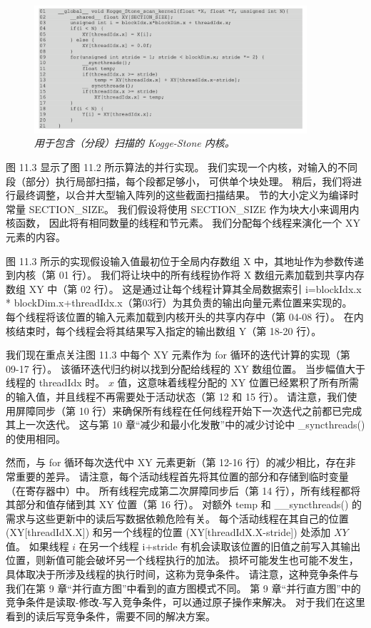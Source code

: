 \begin{figure}[H]
	\centering
	\includegraphics[width=0.9\textwidth]{figs/F11.3.png}
	\caption{\textit{用于包含（分段）扫描的 Kogge-Stone 内核。}}
\end{figure}

图 11.3 显示了图 11.2 所示算法的并行实现。 我们实现一个内核，对输入的不同段（部分）执行局部扫描，每个段都足够小，
可供单个块处理。 稍后，我们将进行最终调整，以合并大型输入阵列的这些截面扫描结果。 
节的大小定义为编译时常量 SECTION\_SIZE。 我们假设将使用 SECTION\_SIZE 作为块大小来调用内核函数，
因此将有相同数量的线程和节元素。 我们分配每个线程来演化一个 $\mathrm{XY}$ 元素的内容。

图 11.3 所示的实现假设输入值最初位于全局内存数组 $\mathrm{X}$ 中，其地址作为参数传递到内核（第 01 行）。 
我们将让块中的所有线程协作将 $\mathrm{X}$ 数组元素加载到共享内存数组 XY 中（第 02 行）。 
这是通过让每个线程计算其全局数据索引 i=blockIdx.x * blockDim.x+threadIdx.x（第03行）为其负责的输出向量元素位置来实现的。 
每个线程将该位置的输入元素加载到内核开头的共享内存中（第 04-08 行）。
在内核结束时，每个线程会将其结果写入指定的输出数组 Y（第 18-20 行）。

我们现在重点关注图 11.3 中每个 $\mathrm{XY}$ 元素作为 for 循环的迭代计算的实现（第 09-17 行）。 
该循环迭代归约树以找到分配给线程的 $\mathrm{XY}$ 数组位置。 当步幅值大于线程的 threadIdx 时。 
$x$ 值，这意味着线程分配的 XY 位置已经累积了所有所需的输入值，并且线程不再需要处于活动状态（第 12 和 15 行）。 
请注意，我们使用屏障同步（第 10 行）来确保所有线程在任何线程开始下一次迭代之前都已完成其上一次迭代。 
这与第 10 章“减少和最小化发散”中的减少讨论中 \_syncthreads() 的使用相同。

然而，与 for 循环每次迭代中 XY 元素更新（第 12-16 行）的减少相比，存在非常重要的差异。 
请注意，每个活动线程首先将其位置的部分和存储到临时变量（在寄存器中）中。 
所有线程完成第二次屏障同步后（第 14 行），所有线程都将其部分和值存储到其 $\mathrm{XY}$ 位置（第 16 行）。 
对额外 temp 和 \_\_syncthreads() 的需求与这些更新中的读后写数据依赖危险有关。 
每个活动线程在其自己的位置 (XY[threadIdX.X]) 和另一个线程的位置 (XY[threadIdX.X-stride]) 处添加 $X Y$ 值。 
如果线程 $i$ 在另一个线程 i+stride 有机会读取该位置的旧值之前写入其输出位置，则新值可能会破坏另一个线程执行的加法。 
损坏可能发生也可能不发生，具体取决于所涉及线程的执行时间，这称为竞争条件。 
请注意，这种竞争条件与我们在第 9 章“并行直方图”中看到的直方图模式不同。 
第 9 章“并行直方图”中的竞争条件是读取-修改-写入竞争条件，可以通过原子操作来解决。 
对于我们在这里看到的读后写竞争条件，需要不同的解决方案。


